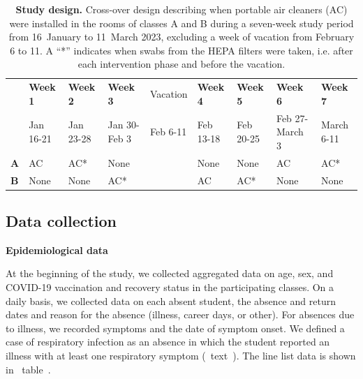 \documentclass[fleqn,11pt]{wlscirep}
\begin{document}
\begin{table}[!htpb]
    \footnotesize
    \centering
    \caption{\textbf{Study design.} Cross-over design describing when portable air cleaners (AC) were installed in the rooms of classes A and B during a seven-week study period from 16~January to 11~March 2023, excluding a week of vacation from February 6 to 11. A ``*'' indicates when swabs from the HEPA filters were taken, i.e. after each intervention phase and before the vacation.}\label{tab:study_design}
    \begin{tabular}{l l l l l l l l l}
    \toprule
      & \textbf{Week 1} & \textbf{Week 2} & \textbf{Week 3} & Vacation & \textbf{Week 4} & \textbf{Week 5} & \textbf{Week 6} & \textbf{Week 7} \\
      & Jan 16-21 & Jan 23-28 & Jan 30-Feb 3 & Feb 6-11 & Feb 13-18 & Feb 20-25 & Feb 27-March 3 & March 6-11 \\
      \midrule
      \textbf{A} & \cellcolor{gray!50} AC & \cellcolor{gray!50} AC\hphantom{0000}*& \cellcolor{gray!10} None & & \cellcolor{gray!10} None & \cellcolor{gray!10} None & \cellcolor{gray!50} AC & \cellcolor{gray!50} AC\hphantom{00009}* \\
      \textbf{B} & \cellcolor{gray!10} None & \cellcolor{gray!10} None & \cellcolor{gray!50} AC\hphantom{0000000}* & & \cellcolor{gray!50} AC & \cellcolor{gray!50} AC\hphantom{0000}*& \cellcolor{gray!10} None & \cellcolor{gray!10} None \\
      \bottomrule
    \end{tabular}
\end{table}
 
\subsection{Data collection}

\noindent\textbf{Epidemiological data} \smallskip

\noindent At the beginning of the study, we collected aggregated data on age, sex, and COVID-19 vaccination and recovery status in the participating classes. On a daily basis, we collected data on each absent student, \ie the absence and return dates and reason for the absence (illness, career days, or other). For absences due to illness, we recorded symptoms and the date of symptom onset. We defined a case of respiratory infection as an absence in which the student reported an illness with at least one respiratory symptom (\supp~text~). The line list data is shown in \supp~table~. \medskip
\end{document}
